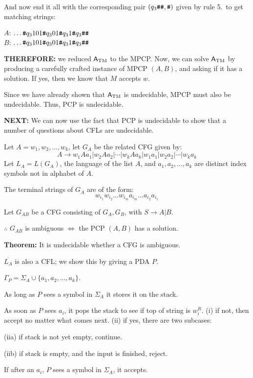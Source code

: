 \begin{frame}
And now end it all with the corresponding pair $(q_3{\texttt{\#}}{\texttt{\#}},{\texttt{\#}})$ given by
rule 5.\ to get matching strings:

$A$: $\ldots{\texttt{\#}}q_3101{\texttt{\#}}q_301{\texttt{\#}}q_31{\texttt{\#}}q_3{\texttt{\#}}{\texttt{\#}}$ \\
$B$: $\ldots{\texttt{\#}}q_3101{\texttt{\#}}q_301{\texttt{\#}}q_31{\texttt{\#}}q_3{\texttt{\#}}{\texttt{\#}}$ 

{\bf THEREFORE:} we reduced $\mathsf{A}_{\mathrm{TM}}$ to the MPCP.  Now, we can solve
$\mathsf{A}_{\mathrm{TM}}$ by producing a carefully crafted instance of MPCP $(A,B)$, and
asking if it has a solution.  If yes, then we know that $M$ accepts
$w$.

Since we have already shown that $\mathsf{A}_{\mathrm{TM}}$ is undecidable, MPCP must also
be undecidable.  Thus, PCP is undecidable.

{\bf NEXT:} We can now use the fact that PCP is undecidable to show
that a number of questions about CFLs are undecidable.
\end{frame}

\begin{frame}
Let $A=w_1,w_2,\ldots,w_k$, let $G_A$ be the related CFG given by:
$$
A\longrightarrow w_1Aa_1|w_2Aa_2|\cdots|w_kAa_k|w_1a_1|w_2a_2|\cdots|w_ka_k
$$
Let $L_A=L(G_A)$, the language of the list $A$, and
$a_1,a_2,\ldots,a_k$ are distinct index symbols not in alphabet of
$A$.

The terminal strings of $G_A$ are of the form:
$$
w_{i_1}w_{i_2}\ldots w_{i_m}a_{i_m}\ldots a_{i_2}a_{i_1}
$$

Let $G_{AB}$ be a CFG consisting of $G_A,G_B$, with $S\longrightarrow
A|B$.

$\therefore$ $G_{AB}$ is ambiguous $\iff$ the PCP $(A,B)$ has a
solution.

{\bf Theorem:}  It is undecidable whether a CFG is ambiguous.
\end{frame}

\begin{frame}
$\overline{L_A}$ is also a CFL; we show this by giving a PDA $P$.

$\Gamma_P=\Sigma_A\cup\{a_1,a_2,\ldots,a_k\}$.

As long as $P$ sees a symbol in $\Sigma_A$ it stores it on the stack.

As soon as $P$ sees $a_i$, it pops the stack to see if top of string
is $w_i^R$.  (i) if not, then accept no matter what comes next.  (ii)
if yes, there are two subcases:

(iia) if stack is not yet empty, continue.

(iib) if stack is empty, and the input is finished, reject.

If after an $a_i$, $P$ sees a symbol in $\Sigma_A$, it accepts.
\end{frame}

